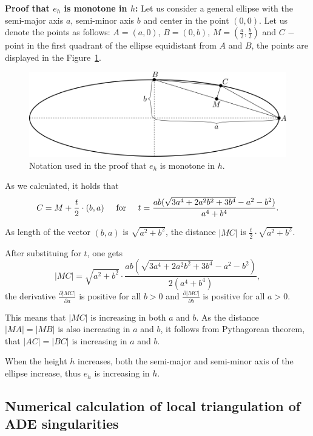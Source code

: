 \textbf{Proof that $e_h$ is monotone in $h$:} Let us consider a general ellipse
with the semi-major axis $a$, semi-minor axis $b$ and center in the point $(0, 0)$. 
Let us denote the points as follows: $A=(a, 0)$, $B=(0, b)$, $M=(\frac{a}{2}, \frac{b}{2})$ 
and $C$ $-$ point in the first quadrant of the ellipse equidistant from $A$ and $B$, the points
are displayed in the Figure~\ref{img:40}.

\begin{figure}
    \centerline{\includegraphics[scale=0.5]{images/img40}}
    \caption[Notation used in the proof]
    {Notation used in the proof that $e_h$ is monotone in $h$.}
    \label{img:40}
\end{figure}

As we calculated, it holds that
$$C = M + \frac{t}{2} \cdot (b, a) \hspace{5mm} \textrm{for} \hspace{5mm} t=\frac{ab(\sqrt{3a^4+2a^2b^2+3b^4}-a^2-b^2)}{a^4+b^4}.$$

As length of the vector $(b,a)$ is $\sqrt{a^2+b^2}$, the distance 
$|MC|$ is $\frac{t}{2} \cdot \sqrt{a^2+b^2}$.

After substituing for $t$, one gets 
$$|MC|=\sqrt{a^2+b^2}\cdot\frac{ab(\sqrt{3a^4+2a^2b^2+3b^4}-a^2-b^2)}{2(a^4+b^4)},$$
the derivative $\frac{\partial|MC|}{\partial a}$ is positive for all $b>0$ and
$\frac{\partial|MC|}{\partial b}$ is positive for all $a>0$.

This means that $|MC|$ is increasing in both $a$ and $b$. As the distance $|MA|=|MB|$ is 
also increasing in $a$ and $b$, it follows from Pythagorean theorem, that $|AC|=|BC|$
is increasing in $a$ and $b$.

When the height $h$ increases, both the semi-major and semi-minor axis of the ellipse increase,
thus $e_h$ is increasing in $h$.

\subsection{Numerical calculation of local triangulation of ADE singularities}

